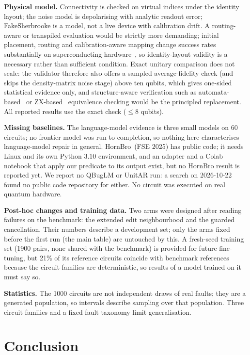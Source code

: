 \documentclass[journal]{IEEEtran}
\begin{document}
\textbf{Physical model.} Connectivity is checked on virtual indices under the
identity layout; the noise model is depolarising with analytic readout error;
FakeSherbrooke is a model, not a live device with calibration drift. A
routing-aware or transpiled evaluation would be strictly more demanding; initial
placement, routing and calibration-aware mapping change success rates
substantially on superconducting hardware~\cite{murali2019noise,nation2025benchmark},
so identity-layout validity is a necessary rather than sufficient condition.
Exact unitary comparison does not scale: the validator therefore also offers a
sampled average-fidelity check (and skips the density-matrix noise stage) above
ten qubits, which gives one-sided statistical evidence only, and
structure-aware verification such as automata-based~\cite{chen2023automata} or
ZX-based~\cite{peham2022zx} equivalence checking would be the principled
replacement. All reported results use the exact check ($\le 8$ qubits).

\textbf{Missing baselines.} The language-model evidence is three small models on 60 circuits; no
frontier model was run to completion, so nothing here characterises language-model repair in
general. HornBro~(FSE 2025) has public code; it needs Linux and its own Python 3.10 environment, and an
adapter and a Colab notebook that apply our predicate to its output exist, but no HornBro result is
reported yet. We report no QBugLM or UnitAR run: a search on 2026-10-22 found no public code repository
for either. No circuit was executed on real quantum hardware.

\textbf{Post-hoc changes and training data.} Two arms were designed after reading failures on the benchmark: the
extended edit neighbourhood and the guarded cancellation. Their numbers describe a development set; only the arms fixed
before the first run (the main table) are untouched by this. A fresh-seed training set (1900 pairs, none shared with the
benchmark) is provided for future fine-tuning, but 21\% of its reference circuits coincide with benchmark references because
the circuit families are deterministic, so results of a model trained on it must say so.

\textbf{Statistics.} The 1000 circuits are not independent draws of real
faults; they are a generated population, so intervals describe sampling over
that population. Three circuit families and a fixed fault taxonomy limit
generalisation.

\section{Conclusion}
\end{document}
